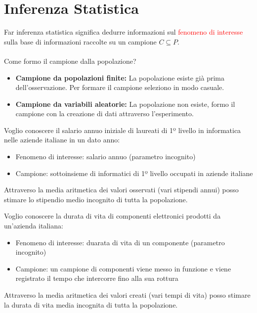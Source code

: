 \documentclass{article}  %
\theoremstyle{definition}
\begin{document}
\section{Inferenza Statistica}
Far inferenza statistica significa dedurre informazioni sul \textcolor{red}{fenomeno di interesse} sulla base di informazioni raccolte su un campione $C \subseteq P$. \\ \\
Come formo il campione dalla popolazione?
\begin{itemize}
	\item \textbf{Campione da popolazioni finite:} La popolazione esiste già prima dell'osservazione. Per formare il campione seleziono in modo casuale.
	\item \textbf{Campione da variabili aleatorie:} La popolazione non esiste, formo il campione con la creazione di dati attraverso l'esperimento.
\end{itemize}
\begin{esempio}
	Voglio conoscere il salario annuo iniziale di laureati di 1º livello in informatica nelle aziende italiane in un dato anno:
	\begin{itemize}
		\item Fenomeno di interesse: salario annuo (parametro incognito)
		\item Campione: sottoinsieme di informatici di 1º livello occupati in aziende italiane
	\end{itemize}
	Attraverso la media aritmetica dei valori osservati (vari stipendi annui) posso stimare lo stipendio medio incognito di tutta la popolazione.
\end{esempio}
\begin{esempio}
	Voglio conoscere la durata di vita di componenti elettronici prodotti da un'azienda italiana:
	\begin{itemize}
		\item Fenomeno di interesse: duarata di vita di un componente (parametro incognito)
		\item Campione: un campione di componenti viene messo in funzione e viene registrato il tempo che intercorre fino alla sua rottura
	\end{itemize}
	Attraverso la media aritmetica dei valori creati (vari tempi di vita) posso stimare la durata di vita media incognita di tutta la popolazione.
\end{esempio}
\end{document}
